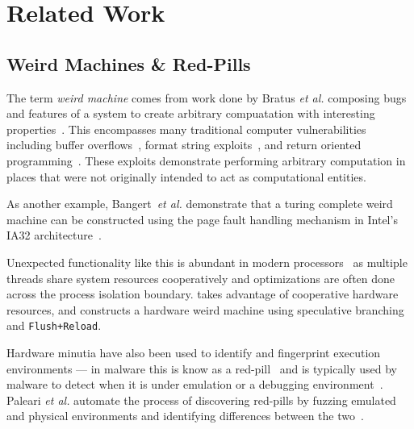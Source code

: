 
\section{Related Work}
\label{sec:related-work}


\subsection{Weird Machines \& Red-Pills}


The term \textit{weird machine} comes from work done by Bratus \textit{et al.}
composing bugs and features of a system to create arbitrary compuatation with
interesting properties~\cite{weird_machines,bratus2011exploit,weird_exploits}. This 
encompasses many traditional computer vulnerabilities including 
buffer overflows~\cite{buffer_overflow}, format string exploits~\cite{format_string_exploit},
and return oriented programming~\cite{shacham2007geometry}. These exploits
demonstrate performing arbitrary computation in places that were not originally
intended to act as computational entities.

As another example, Bangert~\textit{et al.} demonstrate that a turing complete weird machine 
can be constructed using the page fault handling mechanism in Intel's
IA32 architecture~\cite{bangert2013page}. 

Unexpected functionality like this is abundant in modern
processors~\cite{d2015exploiting} as multiple threads share system resources
cooperatively and optimizations are often done across the process
isolation boundary. \speculake takes advantage of cooperative hardware
resources, and constructs a hardware weird machine
using speculative branching and \texttt{Flush+Reload}.

\smallskip

Hardware minutia have also been used to identify and fingerprint execution
environments --- in malware this is know as a red-pill~\cite{red-pill} and 
is typically used by malware to detect when it is under emulation or
a debugging environment~\cite{lindorfer2011detecting, balzarotti2010efficient}. Paleari
\textit{et al.} automate the process of discovering red-pills by
fuzzing emulated and physical environments and identifying
differences between the two~\cite{paleari2009fistful}.

